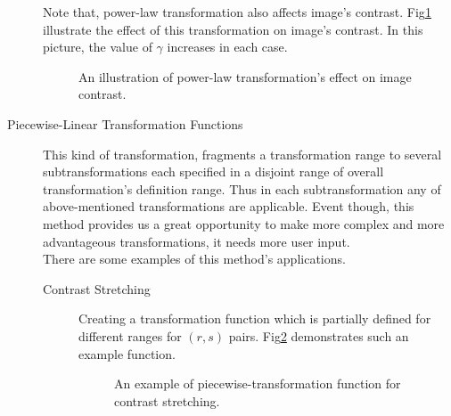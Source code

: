 \documentclass{article}
\begin{document}
\begin{description}
 Note that, power-law transformation also affects image's contrast. Fig\ref{fig:powerLawContrast} illustrate the effect of this transformation on image's contrast. In this picture, the value of $\gamma$ increases in each case.
 
 \begin{figure}
 \center
 \caption{An illustration of power-law transformation's effect on image contrast.}
 \label{fig:powerLawContrast}
 \end{figure}
 
 
 \item [Piecewise-Linear Transformation Functions] This kind of transformation, fragments a transformation range to several subtransformations each specified in a disjoint range of overall transformation's definition range. Thus in each subtransformation any of above-mentioned transformations are applicable. Event though, this method provides us a great opportunity to make more complex and more advantageous transformations, it needs more user input.\\
 There are some examples of this method's applications.
 \begin{description}
 \item [Contrast Stretching] Creating a transformation function which is partially defined for different ranges for $(r,s)$ pairs. Fig\ref{fig:[pieceWiseContrast} demonstrates such an example function.
 \begin{figure}
 \center
 \caption{An example of piecewise-transformation function for contrast stretching.}
 \label{fig:[pieceWiseContrast}
 \end{figure}
 

\end{description}
\end{description}
\end{document}
